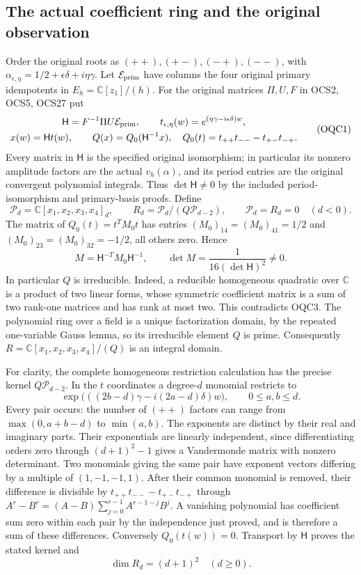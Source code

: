 \documentclass[11pt,a4paper]{article}
\begin{document}
\subsection{The actual coefficient ring and the original observation}
Order the original roots as $(++),(+-),(-+),(--)$, with
$\alpha_{\epsilon,\eta}=1/2+\epsilon\delta+i\eta\gamma$.
Let $\mathcal E_{\rm prim}$ have columns the four original primary
idempotents in $E_h=\mathbb C[z_1]/(h)$. For the original matrices
$\Pi,U,F$ in OCS2, OCS5, OCS27 put
\[
\begin{gathered}
 \mathsf H=F^{-1}\Pi U\mathcal E_{\rm prim},\qquad
 t_{\epsilon,\eta}(w)=e^{(\eta\gamma-i\epsilon\delta)w},\\
 x(w)=\mathsf Ht(w),\qquad
 Q(x)=Q_0(\mathsf H^{-1}x),\quad
 Q_0(t)=t_{++}t_{--}-t_{+-}t_{-+}.
\end{gathered}\tag{OQC1}
\]
Every matrix in $\mathsf H$ is the specified original isomorphism;
in particular its nonzero amplitude factors are the actual
$v_h(\alpha)$, and its period entries are the original convergent
polynomial integrals. Thus $\det\mathsf H\ne0$ by the included
period-isomorphism and primary-basis proofs. Define
\[
 \mathscr P_d=\mathbb C[x_1,x_2,x_3,x_4]_d,\qquad
 R_d=\mathscr P_d/(Q\mathscr P_{d-2}),\qquad
 \mathscr P_d=R_d=0\quad(d<0).
 \tag{OQC2}
\]
The matrix of $Q_0(t)=t^TM_0t$ has entries
$(M_0)_{14}=(M_0)_{41}=1/2$ and
$(M_0)_{23}=(M_0)_{32}=-1/2$, all others zero. Hence
\[
 M=\mathsf H^{-T}M_0\mathsf H^{-1},\qquad
 \det M=\frac{1}{16(\det\mathsf H)^2}\ne0.
 \tag{OQC3}
\]
In particular $Q$ is irreducible. Indeed, a reducible homogeneous
quadratic over $\mathbb C$ is a product of two linear forms, whose
symmetric coefficient matrix is a sum of two rank-one matrices and
has rank at most two. This contradicts OQC3. The polynomial ring
over a field is a unique factorization domain, by the repeated
one-variable Gauss lemma, so its irreducible element $Q$ is prime.
Consequently $R=\mathbb C[x_1,x_2,x_3,x_4]/(Q)$ is an integral domain.

For clarity, the complete homogeneous restriction calculation has
the precise kernel $Q\mathscr P_{d-2}$. In the $t$ coordinates a
degree-$d$ monomial restricts to
\[
 \exp\bigl(((2b-d)\gamma-i(2a-d)\delta)w\bigr),
       \qquad 0\leq a,b\leq d.
 \tag{OQC4}
\]
Every pair occurs: the number of $(++)$ factors can range from
$\max(0,a+b-d)$ to $\min(a,b)$. The exponents are distinct by
their real and imaginary parts. Their exponentials are linearly
independent, since differentiating orders zero through $(d+1)^2-1$
gives a Vandermonde matrix with nonzero determinant. Two monomials
giving the same pair have exponent vectors differing by a multiple
of $(1,-1,-1,1)$. After their common monomial is removed, their
difference is divisible by $t_{++}t_{--}-t_{+-}t_{-+}$ through
$A^r-B^r=(A-B)\sum_{j=0}^{r-1}A^{r-1-j}B^j$. A vanishing
polynomial has coefficient sum zero within each pair by the
independence just proved, and is therefore a sum of these differences.
Conversely $Q_0(t(w))=0$. Transport by $\mathsf H$ proves the
stated kernel and
\[
                  \dim R_d=(d+1)^2\quad(d\geq0).
 \tag{OQC5}
\]
\end{document}
